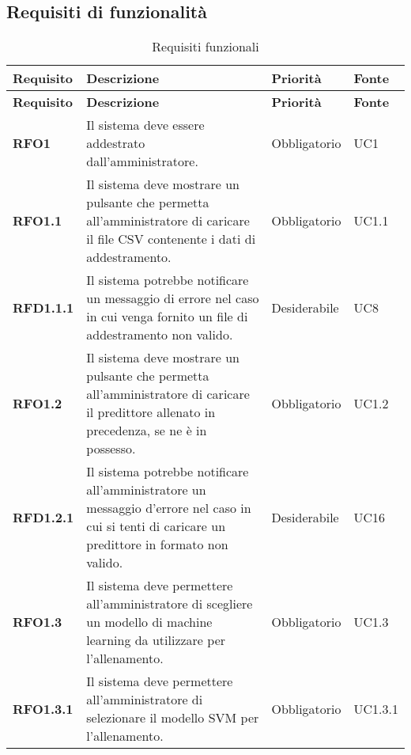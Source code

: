 \subsection{Requisiti di funzionalità}
\label{sub:requisiti_di_funzionalita}

\renewcommand{\arraystretch}{2} %
\begin{longtable}[H]{>{\centering\bfseries}m{2cm} >{\centering}m{9cm} >{\centering}m{2.5cm} >{\centering\arraybackslash}m{2.5cm}}
  \caption{Requisiti funzionali}%
  \label{tab:requisiti_funzionali}                                                    \\
  \rowcolor{lightgray}
  {\textbf{Requisito}} & {\textbf{Descrizione}} & {\textbf{Priorità}} & {\textbf{Fonte}}  \\
  \endfirsthead%
  \rowcolor{lightgray}
  {\textbf{Requisito}} & {\textbf{Descrizione}} & {\textbf{Priorità}} & {\textbf{Fonte}}  \\
  \endhead%
  \rowcolor{white}
  \multicolumn{4}{c}{\textit{Continua alla pagina successiva}}
  \endfoot%
  \endlastfoot%
  \textbf{RFO1} & Il sistema deve essere addestrato dall'amministratore. & Obbligatorio & UC1 \\
  \textbf{RFO1.1} & Il sistema deve mostrare un pulsante che permetta all'amministratore di caricare il file CSV contenente i dati di addestramento.  & Obbligatorio & UC1.1 \\
  \textbf{RFD1.1.1} & Il sistema potrebbe notificare un messaggio di errore nel caso in cui venga fornito un file di addestramento non valido. & Desiderabile & UC8 \\
  \textbf{RFO1.2} & Il sistema deve mostrare un pulsante che permetta all'amministratore di caricare il predittore allenato in precedenza, se ne è in possesso. & Obbligatorio & UC1.2 \\
  \textbf{RFD1.2.1} & Il sistema potrebbe notificare all'amministratore un messaggio d'errore nel caso in cui si tenti di caricare un predittore in formato non valido. & Desiderabile & UC16 \\
  \textbf{RFO1.3} & Il sistema deve permettere all'amministratore di scegliere un modello di machine learning da utilizzare per l'allenamento. & Obbligatorio & UC1.3 \\
  \textbf{RFO1.3.1} & Il sistema deve permettere all'amministratore di selezionare il modello SVM per l'allenamento. & Obbligatorio & UC1.3.1 \\

\end{longtable}
